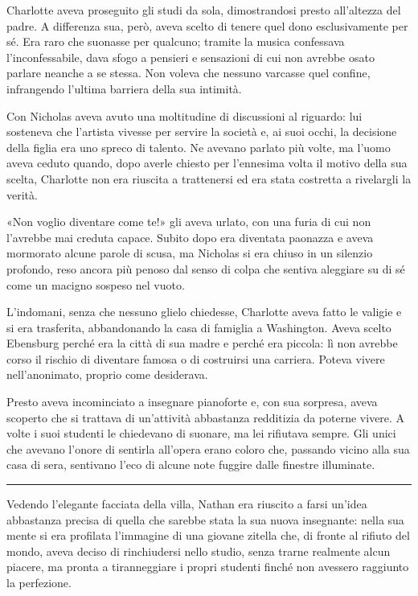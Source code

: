 Charlotte aveva proseguito gli studi da sola, dimostrandosi presto all'altezza del padre. A
differenza sua, però, aveva scelto di tenere quel dono esclusivamente per sé. Era raro che suonasse
per qualcuno; tramite la musica confessava l'inconfessabile, dava sfogo a pensieri e sensazioni di
cui non avrebbe osato parlare neanche a se stessa. Non voleva che nessuno varcasse quel confine,
infrangendo l'ultima barriera della sua intimità.

Con Nicholas aveva avuto una moltitudine di discussioni al riguardo: lui sosteneva che l'artista
vivesse per servire la società e, ai suoi occhi, la decisione della figlia era uno spreco di
talento. Ne avevano parlato più volte, ma l'uomo aveva ceduto quando, dopo averle chiesto per
l'ennesima volta il motivo della sua scelta, Charlotte non era riuscita a trattenersi ed era stata
costretta a rivelargli la verità.

«Non voglio diventare come te!» gli aveva urlato, con una furia di cui non l'avrebbe mai creduta
capace. Subito dopo era diventata paonazza e aveva mormorato alcune parole di scusa, ma Nicholas si
era chiuso in un silenzio profondo, reso ancora più penoso dal senso di colpa che sentiva aleggiare
su di sé come un macigno sospeso nel vuoto.

L'indomani, senza che nessuno glielo chiedesse, Charlotte aveva fatto le valigie e si era
trasferita, abbandonando la casa di famiglia a Washington. Aveva scelto Ebensburg perché era la
città di sua madre e perché era piccola: lì non avrebbe corso il rischio di diventare famosa o di
costruirsi una carriera. Poteva vivere nell'anonimato, proprio come desiderava.

Presto aveva incominciato a insegnare pianoforte e, con sua sorpresa, aveva scoperto che si trattava
di un'attività abbastanza redditizia da poterne vivere. A volte i suoi studenti le chiedevano di
suonare, ma lei rifiutava sempre. Gli unici che avevano l'onore di sentirla all'opera erano coloro
che, passando vicino alla sua casa di sera, sentivano l'eco di alcune note fuggire dalle finestre
illuminate.

\plainbreak{1}

Vedendo l'elegante facciata della villa, Nathan era riuscito a farsi un'idea abbastanza precisa di
quella che sarebbe stata la sua nuova insegnante: nella sua mente si era profilata l'immagine di una
giovane zitella che, di fronte al rifiuto del mondo, aveva deciso di rinchiudersi nello studio,
senza trarne realmente alcun piacere, ma pronta a tiranneggiare i propri studenti finché non
avessero raggiunto la perfezione.

